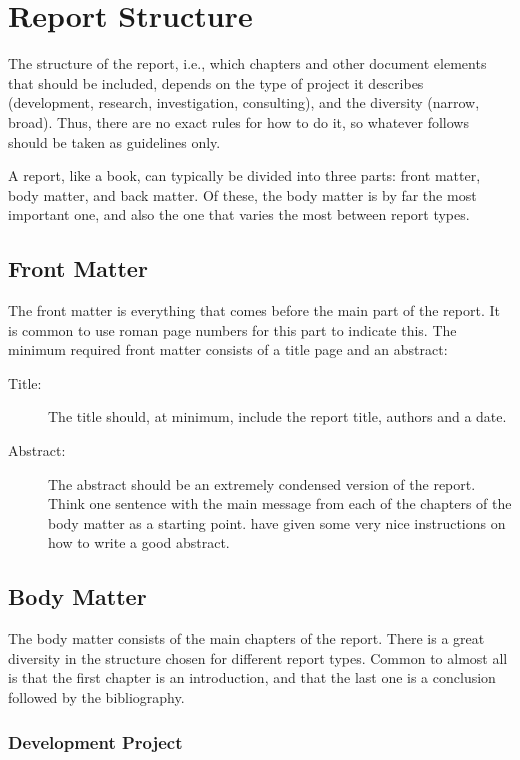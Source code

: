 \section{Report Structure}

The structure of the report, i.e., which chapters and other document elements that should be included, depends on the type of project it describes (development, research, investigation, consulting), and the diversity (narrow, broad). Thus, there are no exact rules for how to do it, so whatever follows should be taken as guidelines only.

A report, like a book, can typically be divided into three parts: front matter, body matter, and back matter. Of these, the body matter is by far the most important one, and also the one that varies the most between report types.

\subsection{Front Matter}
\label{sec:frontmatter}

The front matter is everything that comes before the main part of the report. It is common to use roman page numbers for this part to indicate this. The minimum required front matter consists of a title page and an abstract:

\begin{description}
    \item[Title:] The title should, at minimum, include the report title, authors and a date.
    \item[Abstract:] The abstract should be an extremely condensed version of the report. Think one sentence with the main message from each of the chapters of the body matter as a starting point. \textcite{landes1951scrutiny} have given some very nice instructions on how to write a good abstract.
\end{description}

\subsection{Body Matter}

The body matter consists of the main chapters of the report. There is a great diversity in the structure chosen for different report types. Common to almost all is that the first chapter is an introduction, and that the last one is a conclusion followed by the bibliography.

\subsubsection{Development Project}
\label{sec:development}


